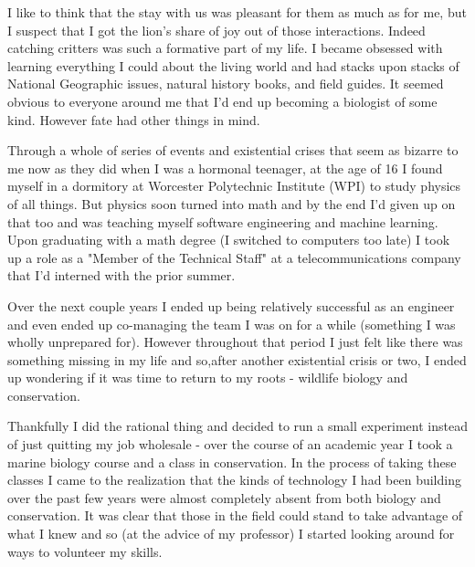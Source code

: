 \documentclass[11pt]{book}
\begin{document}
I like to think that the stay with us was pleasant for them as much as for me, but I suspect that I got the lion's share of joy out of those interactions. Indeed catching critters was such a formative part of my life. I became obsessed with learning everything I could about the living world and had stacks upon stacks of National Geographic issues, natural history books, and field guides. It seemed obvious to everyone around me that I'd end up becoming a biologist of some kind. However fate had other things in mind.
\newline

Through a whole of series of events and existential crises that seem as bizarre to me now as they did when I was a hormonal teenager, at the age of 16 I found myself in a dormitory at Worcester Polytechnic Institute (WPI) to study physics of all things. But physics soon turned into math and by the end I'd given up on that too and was teaching myself software engineering and machine learning. Upon graduating with a math degree (I switched to computers too late) I took up a role as a "Member of the Technical Staff" at a telecommunications company that I'd interned with the prior summer.
\newline

Over the next couple years I ended up being relatively successful as an engineer and even ended up co-managing the team I was on for a while (something I was wholly unprepared for). However throughout that period I just felt like there was something missing in my life and so,after another existential crisis or two, I ended up wondering if it was time to return to my roots - wildlife biology and conservation. 
\newline

Thankfully I did the rational thing and decided to run a small experiment instead of just quitting my job wholesale - over the course of an academic year I took a marine biology course and a class in conservation. In the process of taking these classes I came to the realization that the kinds of technology I had been building over the past few years were almost completely absent from both biology and conservation. It was clear that those in the field could stand to take advantage of what I knew and so (at the advice of my professor) I started looking around for ways to volunteer my skills.
\newline
\end{document}
